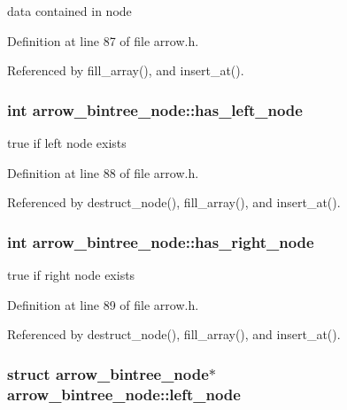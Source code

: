 data contained in node 

Definition at line 87 of file arrow.h.

Referenced by fill\_\-array(), and insert\_\-at().\hypertarget{structarrow__bintree__node_a359d3d029023fb8763af3329207ee53}{
\subsubsection{\setlength{\rightskip}{0pt plus 5cm}int {\bf arrow\_\-bintree\_\-node::has\_\-left\_\-node}}}
\label{structarrow__bintree__node_a359d3d029023fb8763af3329207ee53}


true if left node exists 

Definition at line 88 of file arrow.h.

Referenced by destruct\_\-node(), fill\_\-array(), and insert\_\-at().\hypertarget{structarrow__bintree__node_f6f8bb35c520a88841a810777e9bc186}{
\subsubsection{\setlength{\rightskip}{0pt plus 5cm}int {\bf arrow\_\-bintree\_\-node::has\_\-right\_\-node}}}
\label{structarrow__bintree__node_f6f8bb35c520a88841a810777e9bc186}


true if right node exists 

Definition at line 89 of file arrow.h.

Referenced by destruct\_\-node(), fill\_\-array(), and insert\_\-at().\hypertarget{structarrow__bintree__node_e7eb125cad02704a57796b16c49b2983}{
\subsubsection{\setlength{\rightskip}{0pt plus 5cm}struct {\bf arrow\_\-bintree\_\-node}$\ast$ {\bf arrow\_\-bintree\_\-node::left\_\-node}}}
\label{structarrow__bintree__node_e7eb125cad02704a57796b16c49b2983}


